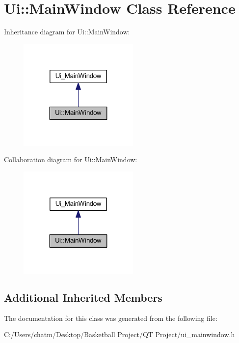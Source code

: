 \hypertarget{class_ui_1_1_main_window}{}\section{Ui\+::Main\+Window Class Reference}
\label{class_ui_1_1_main_window}


Inheritance diagram for Ui\+::Main\+Window\+:\nopagebreak
\begin{figure}[H]
\begin{center}
\leavevmode
\includegraphics[width=167pt]{class_ui_1_1_main_window__inherit__graph}
\end{center}
\end{figure}


Collaboration diagram for Ui\+::Main\+Window\+:\nopagebreak
\begin{figure}[H]
\begin{center}
\leavevmode
\includegraphics[width=167pt]{class_ui_1_1_main_window__coll__graph}
\end{center}
\end{figure}
\subsection*{Additional Inherited Members}


The documentation for this class was generated from the following file\+:\begin{DoxyCompactItemize}
\item 
C\+:/\+Users/chatm/\+Desktop/\+Basketball Project/\+Q\+T Project/ui\+\_\+mainwindow.\+h\end{DoxyCompactItemize}

